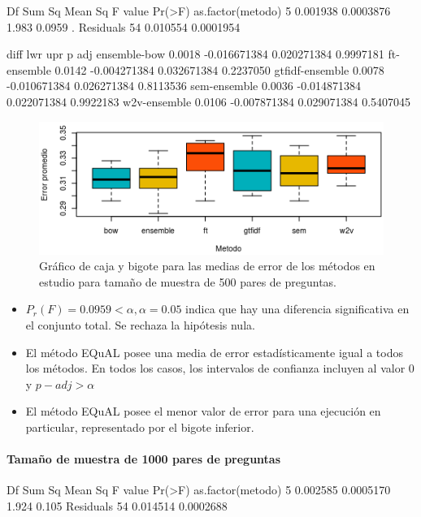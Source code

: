 \begin{rc}
                 Df   Sum Sq   Mean Sq F value Pr(>F)
as.factor(metodo)  5 0.001938 0.0003876   1.983 0.0959 .
Residuals         54 0.010554 0.0001954
\end{rc}

\begin{rc}
                  diff          lwr         upr     p adj
ensemble-bow     0.0018 -0.016671384 0.020271384 0.9997181
ft-ensemble      0.0142 -0.004271384 0.032671384 0.2237050
gtfidf-ensemble  0.0078 -0.010671384 0.026271384 0.8113536
sem-ensemble     0.0036 -0.014871384 0.022071384 0.9922183
w2v-ensemble     0.0106 -0.007871384 0.029071384 0.5407045
\end{rc}

\begin{figure}
	\centering
	\includegraphics[width=0.7\linewidth]{10_resultados/imagenes/anova_500}
	\caption{Gráfico de caja y bigote para las medias de error de los métodos en estudio para tamaño de muestra de 500 pares de preguntas.}
	\label{fig:anova500}
\end{figure}

\begin{itemize}
	\item \(P_r(F) = 0.0959 < \alpha, \alpha = 0.05\) indica que hay una diferencia significativa en el conjunto total. Se rechaza la hipótesis nula.
	\item El método EQuAL posee una media de error estadísticamente igual a todos los métodos. En todos los casos, los intervalos de confianza incluyen al valor 0 y \(p-adj > \alpha\)
	\item El método EQuAL posee el menor valor de error para una ejecución en particular, representado por el bigote inferior.
\end{itemize}

\paragraph{Tamaño de muestra de 1000 pares de preguntas}

\begin{rc}
                 Df   Sum Sq   Mean Sq F value Pr(>F)
as.factor(metodo)  5 0.002585 0.0005170   1.924  0.105
Residuals         54 0.014514 0.0002688
\end{rc}

